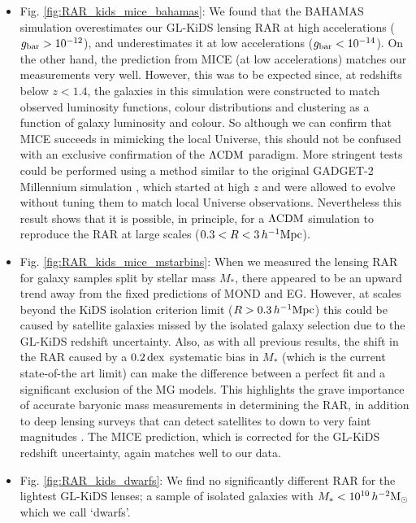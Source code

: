 \documentclass[usenatbib]{mnras}
\newcommand{\hmsun}{\,h^{-2} {\rm M_\odot}}
\newcommand{\hMpc}{\, h^{-1}{\rm{Mpc}} }
\newcommand{\lcdm}{{\rm \Lambda CDM}}
\newcommand{\un}[1]{_{\rm #1}}
\newcommand{\dex}{\, {\rm dex}}
\begin{document}
\begin{itemize}
	\item Fig. \ref{fig:RAR_kids_mice_bahamas}: We found that the BAHAMAS simulation overestimates our GL-KiDS lensing RAR at high accelerations ($g\un{bar}>10^{-12}$), and underestimates it at low accelerations ($g\un{bar}<10^{-14}$). On the other hand, the prediction from MICE (at low accelerations) matches our measurements very well. However, this was to be expected since, at redshifts below $z<1.4$, the galaxies in this simulation were constructed to match observed luminosity functions, colour distributions and clustering as a function of galaxy luminosity and colour. So although we can confirm that MICE succeeds in mimicking the local Universe, this should not be confused with an exclusive confirmation of the $\lcdm$ paradigm. More stringent tests could be performed using a method similar to the original {\scshape GADGET-2} Millennium simulation \cite[]{springel2001,springel2005}, which started at high $z$ and were allowed to evolve without tuning them to match local Universe observations. Nevertheless this result shows that it is possible, in principle, for a $\lcdm$ simulation to reproduce the RAR at large scales ($0.3 < R < 3 \hMpc$).
	
	\item Fig. \ref{fig:RAR_kids_mice_mstarbins}: When we measured the lensing RAR for galaxy samples split by stellar mass $M_*$, there appeared to be an upward trend away from the fixed predictions of MOND and EG. However, at scales beyond the KiDS isolation criterion limit ($R>0.3 \hMpc$) this could be caused by satellite galaxies missed by the isolated galaxy selection due to the GL-KiDS redshift uncertainty. Also, as with all previous results, the shift in the RAR caused by a $0.2 \dex$ systematic bias in $M_*$ (which is the current state-of-the art limit) can make the difference between a perfect fit and a significant exclusion of the MG models. This highlights the grave importance of accurate baryonic mass measurements in determining the RAR, in addition to deep lensing surveys that can detect satellites to down to very faint magnitudes \cite[such as the future Euclid survey;][]{laureijs2011}. The MICE prediction, which is corrected for the GL-KiDS redshift uncertainty, again matches well to our data.
	
	\item Fig. \ref{fig:RAR_kids_dwarfs}: We find no significantly different RAR for the lightest GL-KiDS lenses; a sample of isolated galaxies with $M_* < 10^{10} \hmsun$ which we call `dwarfs'.
	

\end{itemize}
\end{document}
